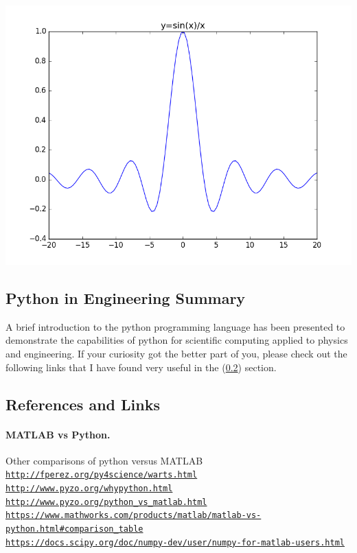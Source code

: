 \documentclass[%
oneside,                 %
final,                   %
10pt]{article}
\begin{document}
\centerline{\includegraphics[width=0.9\linewidth]{fig/matplotlib.png}}




\subsection{Python in Engineering Summary}

A brief introduction to the python programming language has been presented to demonstrate the capabilities of python for scientific computing applied to physics and engineering. If your curiosity got the better part of you, please check out the following links that I have found very useful in the (\ref{sec:reflinks}) section.


\subsection{References and Links}
\label{sec:reflinks}


\paragraph{MATLAB vs Python.}
Other comparisons of python versus MATLAB  \\
\href{{http://fperez.org/py4science/warts.html}}{\nolinkurl{http://fperez.org/py4science/warts.html}} \\
\href{{http://www.pyzo.org/whypython.html}}{\nolinkurl{http://www.pyzo.org/whypython.html}} \\
\href{{http://www.pyzo.org/python_vs_matlab.html}}{\nolinkurl{http://www.pyzo.org/python_vs_matlab.html}} \\
\href{{https://www.mathworks.com/products/matlab/matlab-vs-python.html#comparison_table}}{\nolinkurl{https://www.mathworks.com/products/matlab/matlab-vs-python.html\#comparison_table}} \\
\href{{https://docs.scipy.org/doc/numpy-dev/user/numpy-for-matlab-users.html}}{\nolinkurl{https://docs.scipy.org/doc/numpy-dev/user/numpy-for-matlab-users.html}} \\
\end{document}
